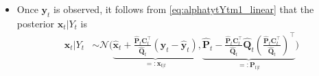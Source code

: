 \documentclass[12pt,a4paper]{article}
\begin{document}
\begin{itemize}
\begin{itemize}
\begin{itemize}
\begin{align}
\begin{bmatrix}
            \bm{C}_{t}\bm{A}_{t}\bm{x}_{t-1|t-1} + \bm{C}_{t}\bm{v}_{t} + \bm{w}_{t}
          \end{bmatrix},
          \bm{\Sigma}
          \right),
          \label{eq:alphatytYtm1_linear}%
      \end{align}
      where
      \begin{equation}\nonumber%
        \bm{\Sigma}
        =
        \begin{bmatrix}
          \bm{A}_{t}\bm{P}_{t-1|t-1}\bm{A}_{t}^{\top} + \bm{V}_{t} & (\bm{A}_{t}\bm{P}_{t-1|t-1}\bm{A}_{t}^{\top} + \bm{V}_{t})\bm{C}_{t}^{\top}\\
          \bm{C}_{t}(\bm{A}_{t}\bm{P}_{t-1|t-1}\bm{A}_{t}^{\top} + \bm{V}_{t})^{\top} & \bm{C}_{t}(\bm{A}_{t}\bm{P}_{t-1|t-1}\bm{A}_{t}^{\top} + \bm{V}_{t})\bm{C}_{t}^{\top} + \bm{W}_{t}\\
        \end{bmatrix},
        \nonumber%
      \end{equation}
      from which we can compute the marginal distributions as
      \begin{equation}\nonumber%
        \bm{x}_{t}|Y_{t-1}
        \sim \mathcal{N} \bigg(
        \underbrace{\bm{A}_{t}\bm{x}_{t-1|t-1} + \bm{v}_{t}}_{=:\hat{\bm{x}}_{t}},
        \underbrace{\bm{A}_{t}\bm{P}_{t-1|t-1}\bm{A}_{t}^{\top} + \bm{V}_{t}}_{=:\hat{\bm{P}}_{t}}
        \bigg),
        \quad
        \bm{y}_{t}|Y_{t-1}
        \sim \mathcal{N} \bigg(
        \underbrace{\bm{C}_{t}\hat{\bm{x}}_{t} + \bm{w}_{t}}_{=:\hat{\bm{y}}_{t}},
        \underbrace{\bm{C}_{t}\hat{\bm{P}}_{t}\bm{C}_{t}^{\top}+\bm{W}_{t}}_{=:\hat{\bm{Q}}_{t}}
        \bigg)
      \end{equation}

    \item Once $\bm{y}_{t}$ is observed, it follows from \eqref{eq:alphatytYtm1_linear}
      that the posterior $\bm{x}_{t}|Y_{t}$ is
      \begin{align}
        \bm{x}_{t}|Y_{t}
        & \sim
          \mathcal{N} \bigg(
          \underbrace{\hat{\bm{x}}_{t} + \frac{\hat{\bm{P}}_{t}\bm{C}_{t}^{\top}}{\hat{\bm{Q}}_{t}}(\bm{y}_{t}-\hat{\bm{y}}_{t})}_{=:\bm{x}_{t|t}},
          \underbrace{\hat{\bm{P}}_{t} - \frac{\hat{\bm{P}}_{t}\bm{C}_{t}^{\top}}{\hat{\bm{Q}}_{t}}\hat{\bm{Q}}_{t}\left(\frac{\hat{\bm{P}}_{t}\bm{C}_{t}^{\top}}{\hat{\bm{Q}}_{t}}\right)^{\top}}_{=:\bm{P}_{t|t}}
          \bigg)
          \label{eq:alphatYt_linear}%
      \end{align}


\end{itemize}
\end{itemize}
\end{itemize}
\end{document}
